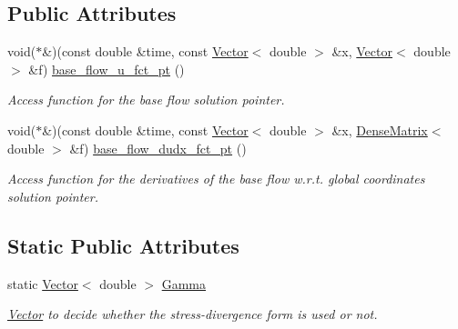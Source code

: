 \subsection*{Public Attributes}
\begin{DoxyCompactItemize}
\item 
void($\ast$\&)(const double \&time, const \hyperlink{classoomph_1_1Vector}{Vector}$<$ double $>$ \&x, \hyperlink{classoomph_1_1Vector}{Vector}$<$ double $>$ \&f) \hyperlink{classoomph_1_1LinearisedAxisymmetricNavierStokesEquations_a6af773978aa51ff94bf1b8d110dcbb9c}{base\+\_\+flow\+\_\+u\+\_\+fct\+\_\+pt} ()
\begin{DoxyCompactList}\small\item\em Access function for the base flow solution pointer. \end{DoxyCompactList}\item 
void($\ast$\&)(const double \&time, const \hyperlink{classoomph_1_1Vector}{Vector}$<$ double $>$ \&x, \hyperlink{classoomph_1_1DenseMatrix}{Dense\+Matrix}$<$ double $>$ \&f) \hyperlink{classoomph_1_1LinearisedAxisymmetricNavierStokesEquations_aaf970cbbb4bc19a598bae53d47a54566}{base\+\_\+flow\+\_\+dudx\+\_\+fct\+\_\+pt} ()
\begin{DoxyCompactList}\small\item\em Access function for the derivatives of the base flow w.\+r.\+t. global coordinates solution pointer. \end{DoxyCompactList}\end{DoxyCompactItemize}
\subsection*{Static Public Attributes}
\begin{DoxyCompactItemize}
\item 
static \hyperlink{classoomph_1_1Vector}{Vector}$<$ double $>$ \hyperlink{classoomph_1_1LinearisedAxisymmetricNavierStokesEquations_a60a4f27376fd947549c50822a9c12a69}{Gamma}
\begin{DoxyCompactList}\small\item\em \hyperlink{classoomph_1_1Vector}{Vector} to decide whether the stress-\/divergence form is used or not. \end{DoxyCompactList}\end{DoxyCompactItemize}
